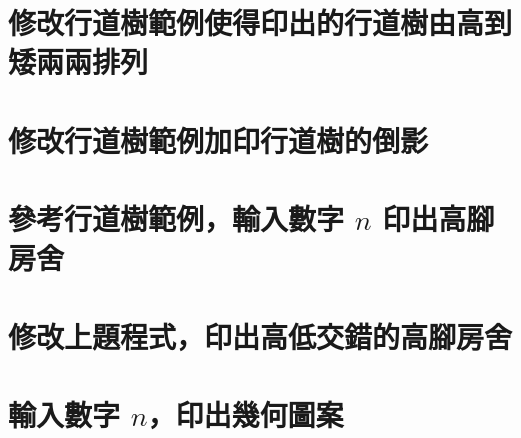 \section{修改行道樹範例使得印出的行道樹由高到矮兩兩排列}


\section{修改行道樹範例加印行道樹的倒影}


\section{參考行道樹範例，輸入數字 $n$ 印出高腳房舍}


\section{修改上題程式，印出高低交錯的高腳房舍}


\section{輸入數字 $n$，印出幾何圖案}


